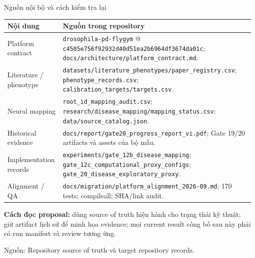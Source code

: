 \documentclass[10pt,aspectratio=169]{beamer}
\newcommand{\hi}[1]{\textcolor{greenteal}{\textbf{#1}}}
\newcommand{\source}[1]{\par\vfill{\fontsize{6.0}{7}\selectfont\color{gray}Nguồn: #1\par}}
\newcommand{\smallgap}{\vspace{0.18cm}}
\begin{document}
\begin{frame}{Nguồn nội bộ và cách kiểm tra lại}
\renewcommand{\arraystretch}{1.18}\scriptsize
\begin{tabular}{@{}L{3.2cm}L{10.5cm}@{}}
\toprule
\textbf{Nội dung} & \textbf{Nguồn trong repository}\\\midrule
Platform contract & \texttt{drosophila-pd-flygym} @ \texttt{c4505e756f92932d40d51ea2b6964df3674da01c}; \texttt{docs/architecture/platform\_contract.md}.\\
Literature / phenotype & \texttt{datasets/literature\_phenotypes/paper\_registry.csv}; \texttt{phenotype\_records.csv}; \texttt{calibration\_targets/targets.csv}.\\
Neural mapping & \texttt{root\_id\_mapping\_audit.csv}; \texttt{research/disease\_mapping/mapping\_status.csv}; \texttt{data/source\_catalog.json}.\\
Historical evidence & \texttt{docs/report/gate20\_progress\_report\_vi.pdf}; Gate 19/20 artifacts và assets của bộ mẫu.\\
Implementation records & \texttt{experiments/gate\_12b\_disease\_mapping}; \texttt{gate\_12c\_computational\_proxy\_configs}; \texttt{gate\_20\_disease\_exploratory\_proxy}.\\
Alignment / QA & \texttt{docs/migration/platform\_alignment\_2026-09.md}; 170 tests; compileall; SHA/link audit.\\\bottomrule
\end{tabular}
\par\smallgap
\hi{Cách đọc proposal:} dùng source of truth hiện hành cho trạng thái kỹ thuật; giữ artifact lịch sử để minh họa evidence; mọi current result công bố sau này phải có run manifest và review tương ứng.
\source{Repository source of truth và target repository records.}
\end{frame}
\end{document}
